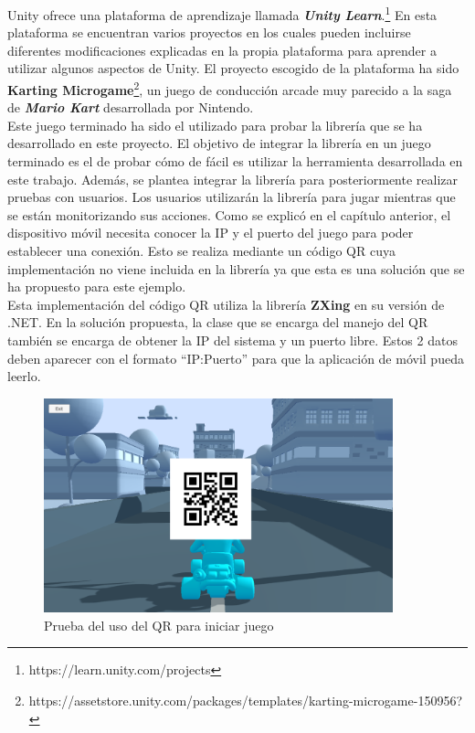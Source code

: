Unity ofrece una plataforma de aprendizaje llamada \textbf{\textit{Unity Learn}}.\footnote{https://learn.unity.com/projects} En esta plataforma se encuentran varios proyectos en los cuales pueden incluirse diferentes modificaciones explicadas en la propia plataforma para aprender a utilizar algunos aspectos de Unity. El proyecto escogido de la plataforma ha sido \textbf{Karting Microgame}\footnote{https://assetstore.unity.com/packages/templates/karting-microgame-150956?}, un juego de conducci\'on arcade muy parecido a la saga de \textbf{\textit{Mario Kart}} desarrollada por Nintendo.\\

Este juego terminado ha sido el utilizado para probar la librer\'ia que se ha desarrollado en este proyecto. El objetivo de integrar la librer\'ia en un juego terminado es el de probar c\'omo de f\'acil es utilizar la herramienta desarrollada en este trabajo. Adem\'as, se plantea integrar la librer\'ia para posteriormente realizar pruebas con usuarios. Los usuarios utilizar\'an la librer\'ia para jugar mientras que se est\'an monitorizando sus acciones. Como se explic\'o en el cap\'itulo anterior, el dispositivo m\'ovil necesita conocer la IP y el puerto del juego para poder establecer una conexi\'on. Esto se realiza mediante un c\'odigo QR cuya implementaci\'on no viene incluida en la librer\'ia ya que esta es una soluci\'on que se ha propuesto para este ejemplo.\\

Esta implementaci\'on del c\'odigo QR utiliza la librer\'ia \textbf{ZXing} en su versi\'on de .NET. En la soluci\'on propuesta, la clase que se encarga del manejo del QR tambi\'en se encarga de obtener la IP del sistema y un puerto libre. Estos 2 datos deben aparecer con el formato ``IP:Puerto'' para que la aplicaci\'on de m\'ovil pueda leerlo. \\


\begin{figure}[!htb]
    \centering
    \includegraphics[width=0.90\textwidth]{./Imagenes/Bitmap/pruebaQR.png}
    \caption{Prueba del uso del QR para iniciar juego}
\label{Fig:QR}
\end{figure}



